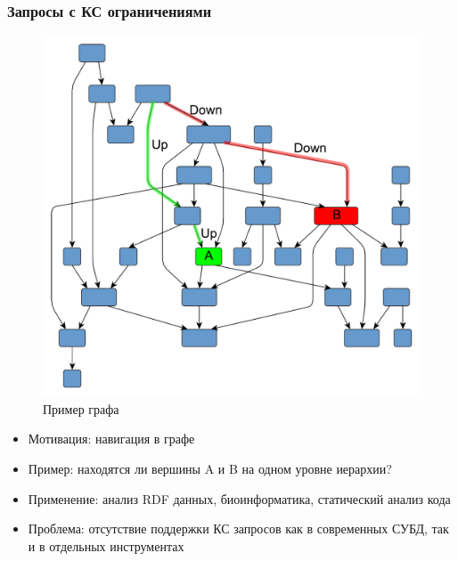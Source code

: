 \documentclass[aspectratio=169,xcolor=table,english]{beamer}
\begin{document}
\begin{frame}[fragile] \frametitle{Запросы с КС ограничениями}
    \begin{minipage}[m]{0.45\linewidth}
        \begin{figure}
            \centering
            \includegraphics[width=\textwidth]{pictures/hierarchical.pdf}
            \caption{Пример графа}
        \end{figure}
    \end{minipage}\hfill
    \begin{minipage}[m]{0.5\linewidth}
        \begin{itemize}
            \item Мотивация: навигация в графе
            \item Пример: находятся ли вершины A и B на одном уровне иерархии?
            \item Применение: анализ RDF данных, биоинформатика, статический анализ кода
            \item Проблема: отсутствие поддержки КС запросов как в современных СУБД, так и в отдельных инструментах
        \end{itemize}
  \end{minipage}
\end{frame}
\end{document}
